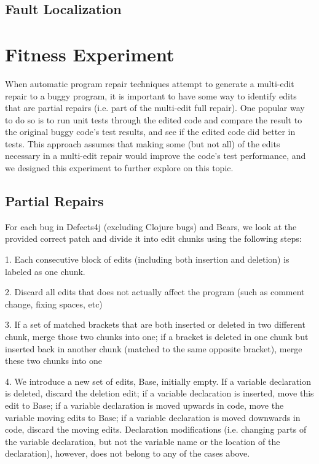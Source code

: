 \documentclass[sigconf, timestamp-false, anonymous=true]{acmart}
\begin{document}
\subsection{Fault Localization}


\section{Fitness Experiment}

When automatic program repair techniques attempt to generate a multi-edit repair to a buggy program, it is important to have some way to identify edits that are partial repairs (i.e. part of the multi-edit full repair). One popular way to do so is to run unit tests through the edited code and compare the result to the original buggy code's test results, and see if the edited code did better in tests. This approach assumes that making some (but not all) of the edits necessary in a multi-edit repair would improve the code's test performance, and we designed this experiment to further explore on this topic.


\subsection{Partial Repairs}

For each bug in Defects4j (excluding Clojure bugs) and Bears, we look at the provided correct patch and divide it into edit chunks using the following steps:

1. Each consecutive block of edits (including both insertion and deletion) is labeled as one chunk.

2. Discard all edits that does not actually affect the program (such as comment change, fixing spaces, etc)

3. If a set of matched brackets that are both inserted or deleted in two different chunk, merge those two chunks into one; if a bracket is deleted in one chunk but inserted back in another chunk (matched to the same opposite bracket), merge these two chunks into one

4. We introduce a new set of edits, Base, initially empty. If a variable declaration is deleted, discard the deletion edit; if a variable declaration is inserted, move this edit to Base; if a variable declaration is moved upwards in code, move the variable moving edits to Base; if a variable declaration is moved downwards in code, discard the moving edits. Declaration modifications (i.e. changing parts of the variable declaration, but not the variable name or the location of the declaration), however, does not belong to any of the cases above.
\end{document}
